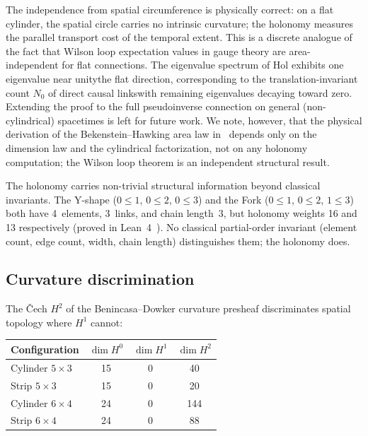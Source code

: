 \documentclass[11pt,a4paper]{article}
\theoremstyle{plain}
\theoremstyle{definition}
\theoremstyle{remark}
\newcommand{\Hol}{\mathrm{Hol}}
\begin{document}
The independence from spatial circumference is physically correct: on a flat cylinder, the spatial circle carries no intrinsic curvature; the holonomy measures the parallel transport cost of the temporal extent.
This is a discrete analogue of the fact that Wilson loop expectation values in gauge theory are area-independent for flat connections.
The eigenvalue spectrum of $\Hol$ exhibits one eigenvalue near unity\textemdash the flat direction, corresponding to the translation-invariant count $N_0$ of direct causal links\textemdash with remaining eigenvalues decaying toward zero.
Extending the proof to the full pseudoinverse connection on general (non-cylindrical) spacetimes is left for future work.
We note, however, that the physical derivation of the Bekenstein--Hawking area law in~\cite{difiore2026bh} depends only on the dimension law and the cylindrical factorization, not on any holonomy computation; the Wilson loop theorem is an independent structural result.

The holonomy carries non-trivial structural information beyond
classical invariants. The Y-shape ($0 \leq 1$, $0 \leq 2$,
$0 \leq 3$) and the Fork ($0 \leq 1$, $0 \leq 2$, $1 \leq 3$)
both have 4~elements, 3~links, and chain length~3, but holonomy
weights 16 and 13 respectively (proved in Lean~4~\cite{leanrepo}).
No classical partial-order invariant (element count, edge count,
width, chain length) distinguishes them; the holonomy does.


\subsection{Curvature discrimination}

The \v{C}ech $H^2$ of the Benincasa--Dowker curvature presheaf discriminates spatial topology where $H^1$ cannot:

\medskip
\begin{center}
\begin{tabular}{lccc}
\toprule
Configuration & $\dim H^0$ & $\dim H^1$ & $\dim H^2$ \\
\midrule
Cylinder $5 \times 3$ & 15 & 0 & 40 \\
Strip $5 \times 3$ & 15 & 0 & 20 \\[2pt]
Cylinder $6 \times 4$ & 24 & 0 & 144 \\
Strip $6 \times 4$ & 24 & 0 & 88 \\
\bottomrule
\end{tabular}
\end{center}
\medskip
\end{document}

